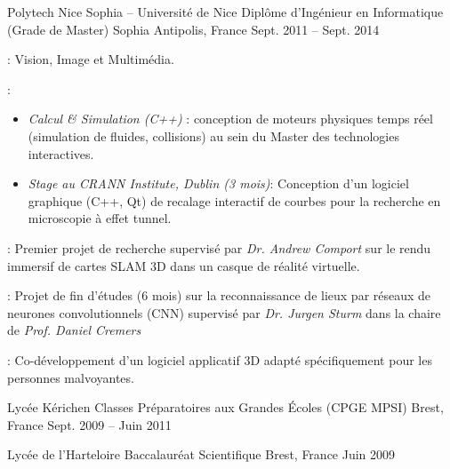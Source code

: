 \begin{cventries}
  \cventry
  {Polytech Nice Sophia -- Université de Nice} %
  {Diplôme d'Ingénieur en Informatique (Grade de Master)} %
  {Sophia Antipolis, France} %
  {Sept. 2011 -- Sept. 2014} %
  {
    \begin{cvitems} %
    \item {} : Vision, Image et Multimédia.
    \item {} :
      \begin{itemize}
        \item \emph{Calcul \& Simulation (C++)} : conception de moteurs physiques temps réel (simulation de
          fluides, collisions) au sein du Master des technologies interactives.
        \item \emph{Stage au CRANN Institute, Dublin (3 mois)}: Conception d'un logiciel graphique (C++, Qt)
          de recalage interactif de courbes pour la recherche en microscopie à effet tunnel.
      \end{itemize}
    \item {} : Premier projet de recherche supervisé par
      \emph{Dr. Andrew Comport} sur le rendu immersif de cartes SLAM 3D dans un casque de réalité virtuelle.
    \item {} : Projet de fin
      d'études (6 mois) sur la reconnaissance de lieux par réseaux de neurones convolutionnels (CNN)
      supervisé par \emph{Dr. Jurgen Sturm} dans la chaire de \emph{Prof. Daniel Cremers}
    \item {} : Co-développement d'un logiciel applicatif 3D adapté
      spécifiquement pour les personnes malvoyantes.
    \end{cvitems}
  }

  \cventry
  {Lycée Kérichen} %
  {Classes Préparatoires aux Grandes Écoles (CPGE MPSI)} %
  {Brest, France} %
  {Sept. 2009 -- Juin 2011} %
  {
  }

  \cventry
  {Lycée de l'Harteloire} %
  {Baccalauréat Scientifique} %
  {Brest, France} %
  {Juin 2009} %
  {
  }
\end{cventries}
